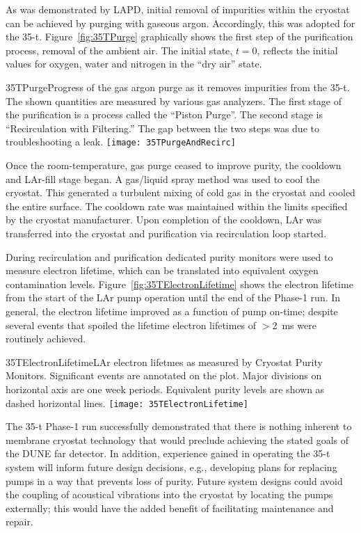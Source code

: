 As was demonstrated by LAPD, initial removal of impurities within the
cryostat can be achieved by purging with gaseous argon. Accordingly,
this was adopted for the 35-t.  Figure~\ref{fig:35TPurge} graphically
shows the first step of the purification process, removal of the
ambient air.  The initial state, $t=0$, reflects the initial values
for oxygen, water and nitrogen in the ``dry air'' state.
\begin{cdrfigure}{35TPurge}{Progress of the gas argon purge as it removes impurities  from the 35-t. The shown quantities are measured by various gas analyzers. The first stage of the purification is a process called the ``Piston Purge''.  The second stage is ``Recirculation with Filtering.'' The gap between the two steps was due to troubleshooting a leak.}
\texttt{[image: 35TPurgeAndRecirc]}
\end{cdrfigure}

Once the room-temperature, gas purge ceased to improve purity,
the cooldown and LAr-fill stage began.  A gas/liquid spray method was
used to cool the cryostat.  This generated a turbulent mixing of cold
gas in the cryostat and cooled the entire surface.  The cooldown rate
was maintained within the limits specified by the cryostat
manufacturer.  Upon completion of the cooldown, LAr was transferred
into the cryostat and purification via recirculation loop started.

During recirculation and purification dedicated purity monitors were
used to measure electron lifetime, which can be translated into
equivalent oxygen contamination levels.
Figure~\ref{fig:35TElectronLifetime} shows the electron lifetime from
the start of the LAr pump operation until the end of the Phase-1 run.
In general, the electron lifetime improved as a function of pump
on-time; despite several events that spoiled the lifetime
electron lifetimes of $>$2~ms were routinely achieved.
\begin{cdrfigure}{35TElectronLifetime}{LAr electron lifetmes as measured by
Cryostat Purity Monitors. Significant events are annotated on the plot. Major divisions on horizontal axis
are one week periods. Equivalent purity levels are shown as dashed horizontal lines.}
\texttt{[image: 35TElectronLifetime]}
\end{cdrfigure}

The 35-t Phase-1 run successfully demonstrated that there is nothing
inherent to membrane cryostat technology that would preclude achieving
the stated goals of the DUNE far detector. In addition, experience
gained in operating the 35-t system will inform future design
decisions, e.g., developing plans for replacing pumps in a way that
prevents loss of purity.  Future system designs could avoid the
coupling of acoustical vibrations into the cryostat by locating the
pumps externally; this would have the added benefit of facilitating
maintenance and repair.

